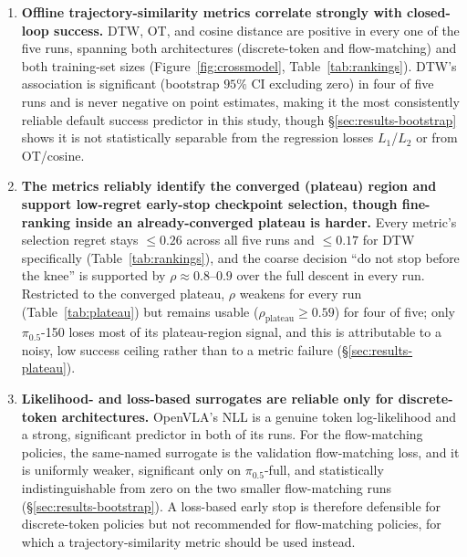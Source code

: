 \documentclass[11pt]{article}
\numberwithin{equation}{section}
\numberwithin{table}{section}
\numberwithin{figure}{section}
\begin{document}
\begin{enumerate}[label=(\alph*)]
  \item \textbf{Offline trajectory-similarity metrics correlate strongly with closed-loop success.}
    \label{conc:correlation}
    DTW, OT, and cosine distance are positive in every one of the five runs, spanning both
    architectures (discrete-token and flow-matching) and both training-set sizes
    (Figure~\ref{fig:crossmodel}, Table~\ref{tab:rankings}). DTW's association is significant (bootstrap
    $95\%$ CI excluding zero) in four of five runs and is never negative on point estimates, making it
    the most consistently reliable default success predictor in this study, though
    \S\ref{sec:results-bootstrap} shows it is not statistically separable from the regression losses
    $L_1$/$L_2$ or from OT/cosine.

  \item \textbf{The metrics reliably identify the converged (plateau) region and support low-regret
    early-stop checkpoint selection, though fine-ranking inside an already-converged plateau is
    harder.} \label{conc:plateau}
    Every metric's selection regret stays $\le0.26$ across all five runs and $\le0.17$ for DTW
    specifically (Table~\ref{tab:rankings}), and the coarse decision ``do not stop before the knee'' is
    supported by $\rho\approx0.8$--$0.9$ over the full descent in every run. Restricted to the converged
    plateau, $\rho$ weakens for every run (Table~\ref{tab:plateau}) but remains usable
    ($\rho_{\mathrm{plateau}}\ge0.59$) for four of five; only $\pi_{0.5}$-150 loses most of its
    plateau-region signal, and this is attributable to a noisy, low success ceiling rather than to a
    metric failure (\S\ref{sec:results-plateau}).

  \item \textbf{Likelihood- and loss-based surrogates are reliable only for discrete-token
    architectures.} \label{conc:nll}
    OpenVLA's NLL is a genuine token log-likelihood and a strong, significant predictor in both of its
    runs. For the flow-matching policies, the same-named surrogate is the validation flow-matching loss,
    and it is uniformly weaker, significant only on $\pi_{0.5}$-full, and statistically indistinguishable
    from zero on the two smaller flow-matching runs (\S\ref{sec:results-bootstrap}). A loss-based early
    stop is therefore defensible for discrete-token policies but not recommended for flow-matching
    policies, for which a trajectory-similarity metric should be used instead.


\end{enumerate}
\end{document}
